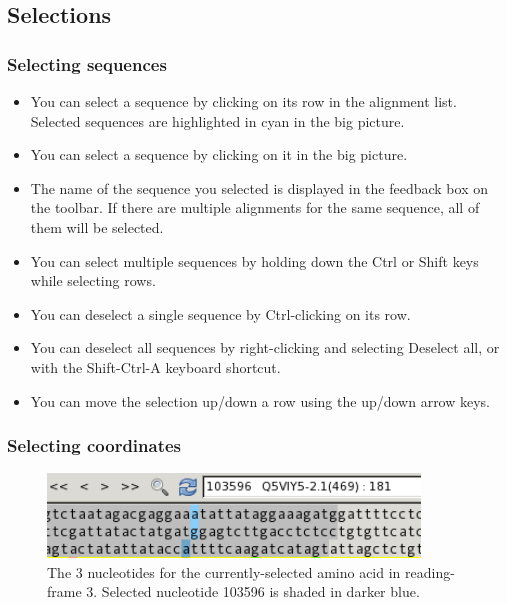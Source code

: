 \documentclass[letterpaper]{article}
\newcommand\liststyleWWviiiNumxxxv{%
\renewcommand\labelitemi{{\textbullet}}
\renewcommand\labelitemii{o}
\renewcommand\labelitemiii{[F0A7?]}
\renewcommand\labelitemiv{[F0B7?]}
}
\begin{document}
{\color[rgb]{0.30980393,0.5058824,0.7411765}\subsection[Selections]{Selections}}
\hypertarget{RefHeading1901056909880}{}
{\color[rgb]{0.30980393,0.5058824,0.7411765}\subsubsection[Selecting sequences]{Selecting sequences}}
\hypertarget{RefHeading1921056909880}{}
\liststyleWWviiiNumxxxv
\begin{itemize}
\item {You can select a sequence by clicking on its row in the alignment list. Selected sequences are highlighted in cyan in the big picture.}
\item {You can select a sequence by clicking on it in the big picture.}
\item {The name of the sequence you selected is displayed in the feedback box on the toolbar. If there are multiple alignments for the same sequence, all of them will be selected.}
\item {You can select multiple sequences by holding down the Ctrl or Shift keys while selecting rows.}
\item {You can deselect a single sequence by Ctrl-clicking on its row.}
\item {You can deselect all sequences by right-clicking and selecting {\textquotesingle}Deselect all{\textquotesingle}, or with the Shift-Ctrl-A keyboard shortcut.}
\item {You can move the selection up/down a row using the up/down arrow keys.}
\end{itemize}

{\color[rgb]{0.30980393,0.5058824,0.7411765}\subsubsection[Selecting coordinates]{Selecting coordinates}}
\hypertarget{RefHeading1941056909880}{}

\begin{figure}
\centering
\color[rgb]{0.30980393,0.5058824,0.7411765}
\includegraphics[width=9.904cm,height=2.244cm]{img_view_selected_codon.png}
\caption{ The 3 nucleotides for the
currently-selected amino acid in reading-frame 3. Selected nucleotide
103596 is shaded in darker blue.}
\end{figure}
\end{document}
